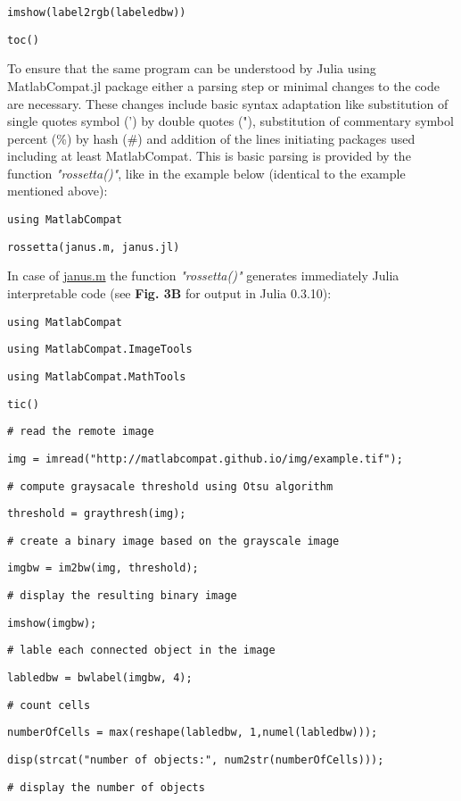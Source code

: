 \verb|imshow(label2rgb(labeledbw))|

\verb|toc()|

To ensure that the same program can be understood by Julia using MatlabCompat.jl package either a parsing step or minimal changes to the code are necessary. These changes include basic syntax adaptation like substitution of single quotes symbol (') by double quotes ("), substitution of commentary symbol percent (\%) by hash (\#) and addition of the lines initiating packages used including at least MatlabCompat. This is basic parsing is provided by the function \textit{"rossetta()"}, like in the example below (identical to the example mentioned above):

\verb|using MatlabCompat|

\verb|rossetta(janus.m, janus.jl)|

In case of \href{https://github.com/MatlabCompat/MatlabCompat.jl/blob/dev/test/janus.m}{janus.m} the function \textit{"rossetta()"} generates immediately Julia interpretable code (see \textbf{Fig. 3B} for output in Julia 0.3.10):

\verb|using MatlabCompat|

\verb|using MatlabCompat.ImageTools|

\verb|using MatlabCompat.MathTools|

\verb|tic()|

\verb|# read the remote image|

\verb|img = imread("http://matlabcompat.github.io/img/example.tif");|

\verb|# compute graysacale threshold using Otsu algorithm|

\verb|threshold = graythresh(img);|

\verb|# create a binary image based on the grayscale image|

\verb|imgbw = im2bw(img, threshold);|

\verb|# display the resulting binary image|

\verb|imshow(imgbw);|

\verb|# lable each connected object in the image|

\verb|labledbw = bwlabel(imgbw, 4);|

\verb|# count cells|

\verb|numberOfCells = max(reshape(labledbw, 1,numel(labledbw)));|

\verb|disp(strcat("number of objects:", num2str(numberOfCells)));|

\verb|# display the number of objects|

